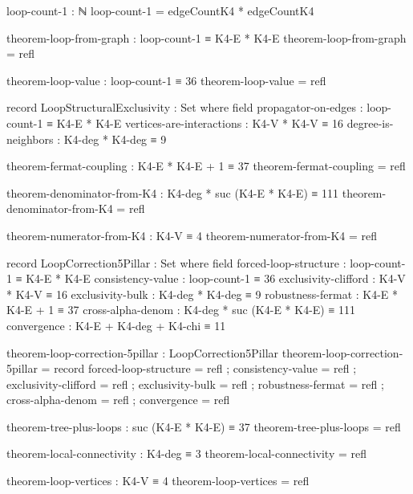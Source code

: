 \documentclass[11pt,a4paper]{book}
\begin{document}
\begin{code}
loop-count-1 : ℕ
loop-count-1 = edgeCountK4 * edgeCountK4

theorem-loop-from-graph : loop-count-1 ≡ K4-E * K4-E
theorem-loop-from-graph = refl

theorem-loop-value : loop-count-1 ≡ 36
theorem-loop-value = refl

record LoopStructuralExclusivity : Set where
  field
    propagator-on-edges : loop-count-1 ≡ K4-E * K4-E
    vertices-are-interactions : K4-V * K4-V ≡ 16
    degree-is-neighbors : K4-deg * K4-deg ≡ 9

theorem-fermat-coupling : K4-E * K4-E + 1 ≡ 37
theorem-fermat-coupling = refl

theorem-denominator-from-K4 : K4-deg * suc (K4-E * K4-E) ≡ 111
theorem-denominator-from-K4 = refl

theorem-numerator-from-K4 : K4-V ≡ 4
theorem-numerator-from-K4 = refl

record LoopCorrection5Pillar : Set where
  field
    forced-loop-structure : loop-count-1 ≡ K4-E * K4-E
    consistency-value : loop-count-1 ≡ 36
    exclusivity-clifford : K4-V * K4-V ≡ 16
    exclusivity-bulk : K4-deg * K4-deg ≡ 9
    robustness-fermat : K4-E * K4-E + 1 ≡ 37
    cross-alpha-denom : K4-deg * suc (K4-E * K4-E) ≡ 111
    convergence : K4-E + K4-deg + K4-chi ≡ 11

theorem-loop-correction-5pillar : LoopCorrection5Pillar
theorem-loop-correction-5pillar = record
  { forced-loop-structure = refl
  ; consistency-value = refl
  ; exclusivity-clifford = refl
  ; exclusivity-bulk = refl
  ; robustness-fermat = refl
  ; cross-alpha-denom = refl
  ; convergence = refl
  }
\end{code}

\begin{code}
theorem-tree-plus-loops : suc (K4-E * K4-E) ≡ 37
theorem-tree-plus-loops = refl
\end{code}

\begin{code}
theorem-local-connectivity : K4-deg ≡ 3
theorem-local-connectivity = refl
\end{code}

\begin{code}
theorem-loop-vertices : K4-V ≡ 4
theorem-loop-vertices = refl
\end{code}
\end{document}
